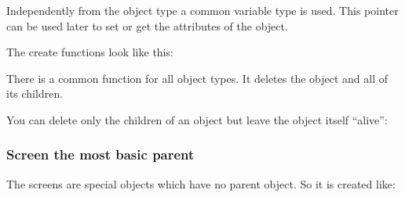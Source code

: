 \documentclass[letterpaper,10pt,english]{sphinxmanual}
\begin{document}
Independently from the object type a common variable type  is used. This pointer can be used later to set or get the attributes of the object.

The create functions look like this:

\begin{sphinxVerbatim}[commandchars=\\\{\}]
        
\end{sphinxVerbatim}

There is a common  function for all object types. It deletes the object and all of its children.

\begin{sphinxVerbatim}[commandchars=\\\{\}]
   
\end{sphinxVerbatim}

You can delete only the children of an object but leave the object itself “alive”:

\begin{sphinxVerbatim}[commandchars=\\\{\}]
   
\end{sphinxVerbatim}


\subsubsection{Screen \textendash{} the most basic parent}
\label{\detokenize{overview/objects:screen-the-most-basic-parent}}
The screens are special objects which have no parent object. So it is created like:

\begin{sphinxVerbatim}[commandchars=\\\{\}]
     
\end{sphinxVerbatim}
\end{document}

